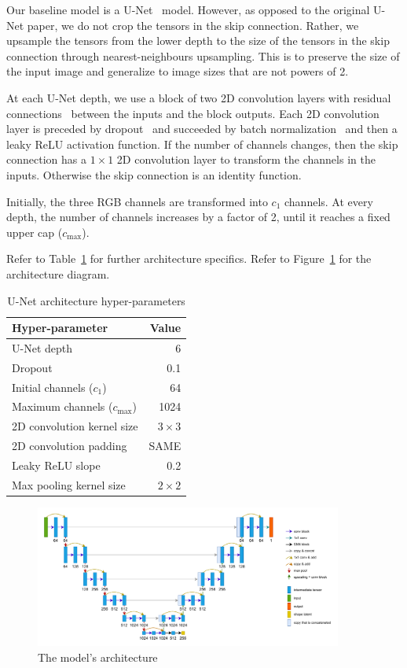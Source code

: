 Our baseline model is a U-Net~\cite{unet} model.
However, as opposed to the original U-Net paper, we do not crop the tensors in the skip connection.
Rather, we upsample the tensors from the lower depth to the size of the tensors in the skip connection through nearest-neighbours upsampling.
This is to preserve the size of the input image and generalize to image sizes that are not powers of 2.

At each U-Net depth, we use a block of two 2D convolution layers with residual connections~\cite{resnet} between the inputs and the block outputs.
Each 2D convolution layer is preceded by dropout~\cite{dropout} and succeeded by batch normalization~\cite{batch-norm} and then a leaky ReLU activation function.
If the number of channels changes, then the skip connection has a $1 \times 1$ 2D convolution layer to transform the channels in the inputs.
Otherwise the skip connection is an identity function.

Initially, the three RGB channels are transformed into $c_1$ channels.
At every depth, the number of channels increases by a factor of 2, until it reaches a fixed upper cap ($c_\mathrm{max}$).%

Refer to Table~\ref{tab:unet-hyper-params} for further architecture specifics.
Refer to Figure~\ref{fig:arch} for the architecture diagram.

\begin{table}[h]
    \centering
    \caption{U-Net architecture hyper-parameters}%
    \label{tab:unet-hyper-params}
    \begin{tabular}{l r}
        \toprule
        Hyper-parameter & Value \\
        \midrule
        U-Net depth & 6 \\
        Dropout & 0.1 \\
        Initial channels ($c_1$) & 64 \\
        Maximum channels ($c_\mathrm{max}$) & 1024 \\%
        2D convolution kernel size & $3 \times 3$ \\
        2D convolution padding & SAME \\
        Leaky ReLU slope & 0.2 \\
        Max pooling kernel size & $2 \times 2$ \\
        \bottomrule
    \end{tabular}
\end{table}

\begin{figure}
    \centering
    \includegraphics[width=0.9\textwidth]{images/CIL-arch.pdf}
    \caption{The model's architecture}%
    \label{fig:arch}
\end{figure}
